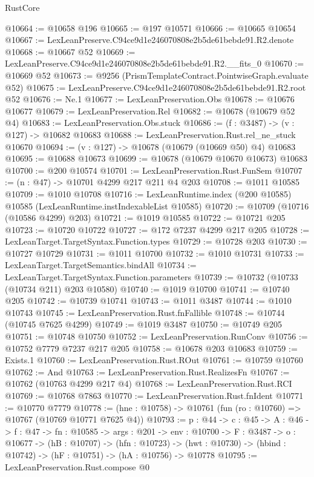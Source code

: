 \begin{lexlean}{RustCore}
\begin{coremodule}
@10664 := @10658 @196
@10665 := @197 @10571
@10666 := @10665 @10654
@10667 := LexLeanPreserve.C94ce9d1e246070808e2b5de61bebde91.R2.denote
@10668 := @10667 @52
@10669 := LexLeanPreserve.C94ce9d1e246070808e2b5de61bebde91.R2.__fits_0
@10670 := @10669 @52
@10673 := @9256 (PrismTemplateContract.PointwiseGraph.evaluate @52)
@10675 := LexLeanPreserve.C94ce9d1e246070808e2b5de61bebde91.R2.root @52
@10676 := Ne.{1}
@10677 := LexLeanPreservation.Obs
@10678 := @10676 @10677
@10679 := LexLeanPreservation.Rel
@10682 := @10678 (@10679 @52 @4)
@10683 := LexLeanPreservation.Obs.stuck
@10686 := (f : @3487) -> (v : @127) -> @10682 @10683
@10688 := LexLeanPreservation.Rust.rel_ne_stuck @10670
@10694 := (v : @127) -> @10678 (@10679 (@10669 @50) @4) @10683
@10695 := @10688 @10673
@10699 := @10678 (@10679 @10670 @10673) @10683
@10700 := @200 @10574
@10701 := LexLeanPreservation.Rust.FunSem
@10707 := (n : @47) -> @10701 @4299 @217 @211 @4 @203
@10708 := @1011 @10585
@10709 := @1010 @10708
@10716 := LexLeanRuntime.index (@200 @10585) @10585 (LexLeanRuntime.instIndexableList @10585)
@10720 := @10709 (@10716 (@10586 @4299) @203)
@10721 := @1019 @10585
@10722 := @10721 @205
@10723 := @10720 @10722
@10727 := @172 @7237 @4299 @217 @205
@10728 := LexLeanTarget.TargetSyntax.Function.types
@10729 := @10728 @203
@10730 := @10727 @10729
@10731 := @1011 @10700
@10732 := @1010 @10731
@10733 := LexLeanTarget.TargetSemantics.bindAll
@10734 := LexLeanTarget.TargetSyntax.Function.parameters
@10739 := @10732 (@10733 (@10734 @211) @203 @10580)
@10740 := @1019 @10700
@10741 := @10740 @205
@10742 := @10739 @10741
@10743 := @1011 @3487
@10744 := @1010 @10743
@10745 := LexLeanPreservation.Rust.fnFallible
@10748 := @10744 (@10745 @7625 @4299)
@10749 := @1019 @3487
@10750 := @10749 @205
@10751 := @10748 @10750
@10752 := LexLeanPreservation.RunConv
@10756 := @10752 @7779 @7237 @217 @205
@10758 := @10678 @203 @10683
@10759 := Exists.{1}
@10760 := LexLeanPreservation.Rust.ROut
@10761 := @10759 @10760
@10762 := And
@10763 := LexLeanPreservation.Rust.RealizesFn
@10767 := @10762 (@10763 @4299 @217 @4)
@10768 := LexLeanPreservation.Rust.RCI
@10769 := @10768 @7863
@10770 := LexLeanPreservation.Rust.fnIdent
@10771 := @10770 @7779
@10778 := (hne : @10758) -> @10761 (fun (ro : @10760) => @10767 (@10769 @10771 @7625 @4))
@10793 := {p : @44} ->
  {c : @45} ->
  {A : @46} ->
  {f : @47} ->
  {fn : @10585} ->
  {args : @201} ->
  {env : @10700} ->
  {F : @3487} ->
  {o : @10677} ->
  (hB : @10707) ->
  (hfn : @10723) -> (hwt : @10730) -> (hbind : @10742) -> (hF : @10751) -> (hA : @10756) -> @10778
@10795 := LexLeanPreservation.Rust.compose @0

\end{coremodule}
\end{lexlean}
